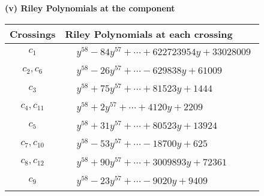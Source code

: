 \documentclass[1p]{elsarticle_modified}
\theoremstyle{definition}
\begin{document}
\newpage\renewcommand{\arraystretch}{1}
\flushleft \textbf{(v) Riley Polynomials at the component}\newline \\
\begin{tabular}{m{50pt}|m{274pt}}
Crossings & \hspace{64pt}Riley Polynomials at each crossing \\
\hline $$\begin{aligned}c_{1}\end{aligned}$$&$\begin{aligned}
&y^{58}-84 y^{57}+\cdots+622723954 y+33028009
\end{aligned}$\\
\hline $$\begin{aligned}c_{2},c_{6}\end{aligned}$$&$\begin{aligned}
&y^{58}-26 y^{57}+\cdots-629838 y+61009
\end{aligned}$\\
\hline $$\begin{aligned}c_{3}\end{aligned}$$&$\begin{aligned}
&y^{58}+75 y^{57}+\cdots+81523 y+1444
\end{aligned}$\\
\hline $$\begin{aligned}c_{4},c_{11}\end{aligned}$$&$\begin{aligned}
&y^{58}+2 y^{57}+\cdots+4120 y+2209
\end{aligned}$\\
\hline $$\begin{aligned}c_{5}\end{aligned}$$&$\begin{aligned}
&y^{58}+31 y^{57}+\cdots+80523 y+13924
\end{aligned}$\\
\hline $$\begin{aligned}c_{7},c_{10}\end{aligned}$$&$\begin{aligned}
&y^{58}-53 y^{57}+\cdots-18700 y+625
\end{aligned}$\\
\hline $$\begin{aligned}c_{8},c_{12}\end{aligned}$$&$\begin{aligned}
&y^{58}+90 y^{57}+\cdots+3009893 y+72361
\end{aligned}$\\
\hline $$\begin{aligned}c_{9}\end{aligned}$$&$\begin{aligned}
&y^{58}-23 y^{57}+\cdots-9020 y+9409
\end{aligned}$\\
\hline
\end{tabular}\\~\\
\end{document}
